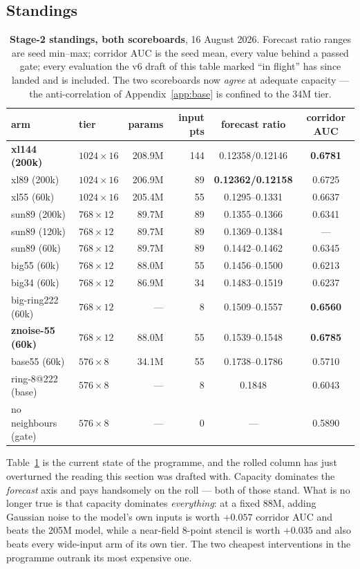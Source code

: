 \documentclass[10pt]{article}
\begin{document}
\subsection{Standings}\label{sec:standings}

\begin{table}[htbp]
\centering\small
\begin{tabular}{llrrcc}
\toprule
arm & tier & params & input pts & forecast ratio & corridor AUC \\
\midrule
\textbf{xl144 (200k)} & $1024\times16$ & 208.9M & 144 & 0.12358/0.12146 & \textbf{0.6781} \\
xl89 (200k) & $1024\times16$ & 206.9M & 89 & \textbf{0.12362/0.12158} & 0.6725 \\
xl55 (60k) & $1024\times16$ & 205.4M & 55 & 0.1295--0.1331 & 0.6637 \\
sun89 (200k) & $768\times12$ & 89.7M & 89 & 0.1355--0.1366 & 0.6341 \\
sun89 (120k) & $768\times12$ & 89.7M & 89 & 0.1369--0.1384 & --- \\
sun89 (60k) & $768\times12$ & 89.7M & 89 & 0.1442--0.1462 & 0.6345 \\
big55 (60k) & $768\times12$ & 88.0M & 55 & 0.1456--0.1500 & 0.6213 \\
big34 (60k) & $768\times12$ & 86.9M & 34 & 0.1483--0.1519 & 0.6237 \\
big-ring222 (60k) & $768\times12$ & --- & 8 & 0.1509--0.1557 & \textbf{0.6560} \\
\textbf{znoise-55 (60k)} & $768\times12$ & 88.0M & 55 & 0.1539--0.1548 & \textbf{0.6785} \\
base55 (60k) & $576\times8$ & 34.1M & 55 & 0.1738--0.1786 & 0.5710 \\
ring-8@222 (base) & $576\times8$ & --- & 8 & 0.1848 & 0.6043 \\
no neighbours (gate) & $576\times8$ & --- & 0 & --- & 0.5890 \\
\bottomrule
\end{tabular}
\caption{\textbf{Stage-2 standings, both scoreboards}, 16 August 2026.
Forecast ratio ranges are seed min--max; corridor AUC is the seed mean,
every value behind a passed gate; every evaluation the v6 draft of this
table marked ``in flight'' has since landed and is included. The two
scoreboards now \emph{agree} at
adequate capacity --- the anti-correlation of Appendix~\ref{app:base}
is confined to the 34M tier.}
\label{tab:standings}
\end{table}

Table~\ref{tab:standings} is the current state of the programme, and
the rolled column has just overturned the reading this section was
drafted with. Capacity dominates the \emph{forecast} axis and pays
handsomely on the roll --- both of those stand. What is no longer true
is that capacity dominates \emph{everything}: at a fixed 88M, adding
Gaussian noise to the model's own inputs is worth $+0.057$ corridor AUC
and beats the 205M model, while a near-field 8-point stencil is worth
$+0.035$ and also beats every wide-input arm of its own tier. The two
cheapest interventions in the programme outrank its most expensive one.
\end{document}
